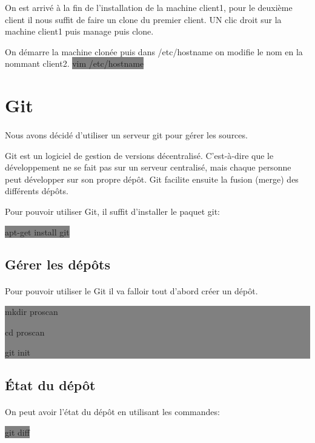 \documentclass[11pt,a4paper,titlepage, oneside]{article}
\begin{document}
		On est arrivé à la fin de l'installation de la machine client1, pour le deuxième client il nous suffit de faire un clone du premier client. UN clic droit sur la machine client1 puis manage puis clone.

	On démarre la machine clonée puis dans /etc/hostname on modifie le nom en la nommant client2.
		\colorbox{gray}{vim /etc/hostname}

	
\newpage
\section{{\color{red} Git}}
	\paragraph{}
		Nous avons décidé d'utiliser un serveur git pour gérer les sources.
		
		Git est un logiciel de gestion de versions décentralisé. C'est-à-dire que le développement ne se fait pas sur un serveur centralisé, mais chaque personne peut développer sur son propre dépôt. Git facilite ensuite la fusion (merge) des différents dépôts.

		Pour pouvoir utiliser Git, il suffit d'installer le paquet git:
	
		\colorbox{gray} {apt-get install git}

	\subsection{{\color{blue} Gérer les dépôts}}
		\paragraph{}
			Pour pouvoir utiliser le Git il va falloir tout d'abord créer un dépôt.
			
			\colorbox{gray}{mkdir proscan

				cd proscan
	
				git init}
	
	\subsection{{\color{blue} État du dépôt}}	
		\paragraph{}
		On peut avoir l'état du dépôt en utilisant les commandes:
		
			\colorbox{gray}{git diff}
			
\end{document}
